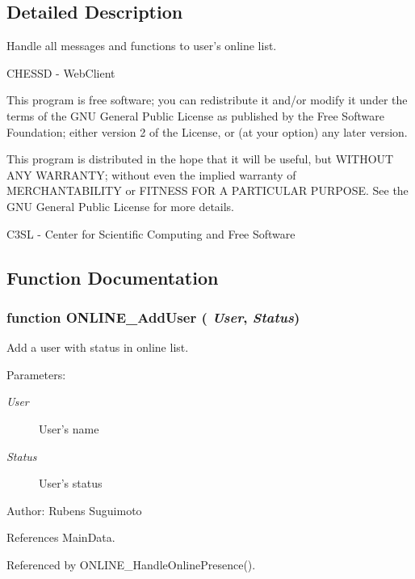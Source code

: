 \subsection{Detailed Description}
Handle all messages and functions to user's online list. 

CHESSD - WebClient

This program is free software; you can redistribute it and/or modify it under the terms of the GNU General Public License as published by the Free Software Foundation; either version 2 of the License, or (at your option) any later version.

This program is distributed in the hope that it will be useful, but WITHOUT ANY WARRANTY; without even the implied warranty of MERCHANTABILITY or FITNESS FOR A PARTICULAR PURPOSE. See the GNU General Public License for more details.

C3SL - Center for Scientific Computing and Free Software 

\subsection{Function Documentation}
\subsubsection[ONLINE\_\-AddUser]{\setlength{\rightskip}{0pt plus 5cm}function ONLINE\_\-AddUser ( {\em User}, \/   {\em Status})}\label{online_8js_4352a3725363a351a87224afb531ffb3}


Add a user with status in online list. 

\begin{Desc}
\item[Parameters:]
\begin{description}
\item[{\em User}]User's name \item[{\em Status}]User's status\end{description}
\end{Desc}
\begin{Desc}
\item[Author:]Rubens Suguimoto \end{Desc}


References MainData.

Referenced by ONLINE\_\-HandleOnlinePresence().
